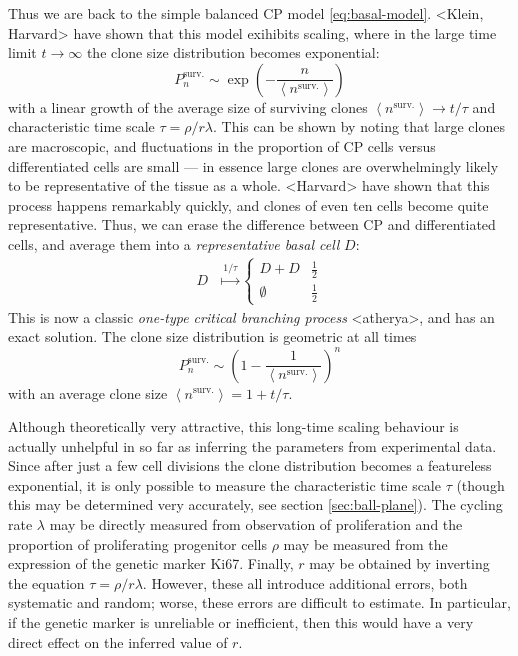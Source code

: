 \documentclass[10pt,UKenglish]{article}
\begin{document}
Thus we are back to the simple balanced CP model \ref{eq:basal-model}. <Klein, Harvard> have shown that this model exihibits scaling, where in the large time limit $t\rightarrow\infty$ the clone size distribution becomes exponential: $$P^\textrm{surv.}_n \sim \exp\left(-\frac{n}{\left\langle n^\textrm{surv.} \right\rangle}\right)$$ with a linear growth of the average size of surviving clones $\left\langle n^\textrm{surv.} \right\rangle \rightarrow t/\tau$ and characteristic time scale $\tau = \rho/r\lambda$. This can be shown by noting that large clones are macroscopic, and fluctuations in the proportion of CP cells versus differentiated cells are small --- in essence large clones are overwhelmingly likely to be representative of the tissue as a whole. <Harvard> have shown that this process happens remarkably quickly, and clones of even ten cells become quite representative. Thus, we can erase the difference between CP and differentiated cells, and average them into a \emph{representative basal cell} $D$: 
\begin{align}
D &\overset{1/\tau}{\longmapsto} \begin{cases}
D+D & \frac{1}{2} \\
\emptyset & \frac{1}{2}\end{cases}\label{eq:simple-balanced-model}
\end{align}
This is now a classic \emph{one-type critical branching process} <atherya>, and has an exact solution. The clone size distribution is geometric at all times $$P^\textrm{surv.}_n \sim \left(1-\frac{1}{\left\langle n^\textrm{surv.} \right\rangle}\right)^n$$ with an average clone size $\left\langle n^\textrm{surv.} \right\rangle = 1 + t/\tau$.

Although theoretically very attractive, this long-time scaling behaviour is actually unhelpful in so far as inferring the parameters from experimental data. Since after just a few cell divisions the clone distribution becomes a featureless exponential, it is only possible to measure the characteristic time scale $\tau$ (though this may be determined very accurately, see section \ref{sec:ball-plane}). The cycling rate $\lambda$ may be directly measured from observation of proliferation and the proportion of proliferating progenitor cells $\rho$ may be measured from the expression of the genetic marker Ki67. Finally, $r$ may be obtained by inverting the equation $\tau = \rho/r\lambda$. However, these all introduce additional errors, both systematic and random; worse, these errors are difficult to estimate. In particular, if the genetic marker is unreliable or inefficient, then this would have a very direct effect on the inferred value of $r$.
\end{document}
